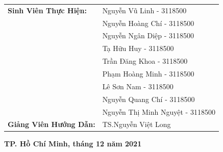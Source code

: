 \begin{titlepage}
    \begin{table}[H]
        \centering
        \begin{tabular}{l l}
            \textbf{\fontsize{14pt}{0pt}\selectfont Sinh Viên Thực Hiện:}
            & \fontsize{14pt}{0pt}\selectfont Nguyễn Vũ Linh - 3118500\\
            & \fontsize{14pt}{0pt}\selectfont Nguyễn Hoàng Chí - 3118500\\
            & \fontsize{14pt}{0pt}\selectfont Nguyễn Ngân Diệp - 3118500\\
            & \fontsize{14pt}{0pt}\selectfont Tạ Hữu Huy - 3118500\\
            & \fontsize{14pt}{0pt}\selectfont Trần Đăng Khoa - 3118500\\
            & \fontsize{14pt}{0pt}\selectfont Phạm Hoàng Minh - 3118500\\
            & \fontsize{14pt}{0pt}\selectfont Lê Sơn Nam - 3118500\\
            & \fontsize{14pt}{0pt}\selectfont Nguyễn Quang Chí - 3118500\\
            & \fontsize{14pt}{0pt}\selectfont Nguyễn Thị Minh Nguyệt - 3118500 \vspace{20pt}\\
            \textbf{\fontsize{14pt}{0pt}\selectfont Giảng Viên Hướng Dẫn:}
            & \fontsize{14pt}{0pt}\selectfont TS.Nguyễn Việt Long\\
        \end{tabular}
    \end{table}
    
    \vspace{20pt}
    \begin{center}
        \textbf{
            \fontsize{16pt}{0pt}
            \selectfont TP. Hồ Chí Minh, tháng 12 năm 2021
        }
    \end{center}
\end{titlepage}